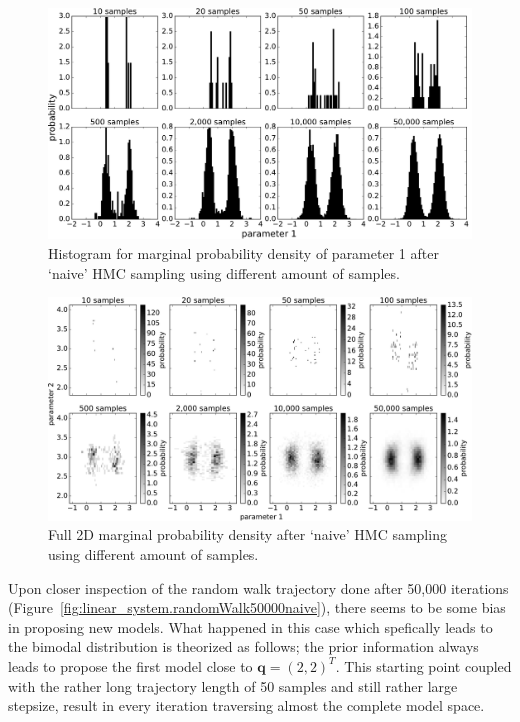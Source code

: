 \begin{figure}
	\centering
	\includegraphics[width=\textwidth]{figures/linear_systems/2d_naive/histogram_p1.pdf}
	\caption{Histogram for marginal probability density of parameter 1 after `naive' HMC sampling using different amount of
	samples.}
	\label{fig:linear_system.histq1}
\end{figure}

\begin{figure}
	\centering
	\includegraphics[width=\textwidth]{figures/linear_systems/2d_naive/histogram_2d.pdf}
	\caption{Full 2D marginal probability density after `naive' HMC sampling using different amount of
	samples.}
	\label{fig:linear_system.hist2d}
\end{figure}

\afterpage{\clearpage}

Upon closer inspection of the random walk trajectory done after 50,000 iterations (Figure~\ref{fig:linear_system.randomWalk50000naive}), there seems to be some bias in proposing new models. What happened in this case which spefically leads to the bimodal distribution is theorized as follows; the prior information always leads to propose the first model close to $\mathbf{q} = (2,2)^T$. This starting point coupled with the rather long trajectory length of 50 samples and still rather large stepsize, result in every iteration traversing almost the complete model space.

